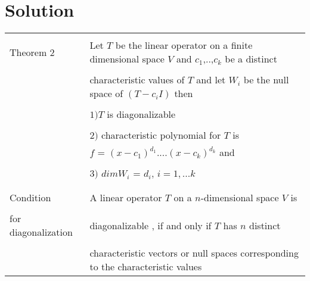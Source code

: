 \documentclass[journal,12pt]{IEEEtran}
\begin{document}
\section{\textbf{Solution}}
\begin{longtable}{|l|l|}
\hline
\multirow{3}{*}{Theorem 2} & \\
& Let $T$ be the linear operator on a finite dimensional space $V$ and $c_1$,..,$c_k$ be a distinct \\
&\\
&characteristic values of $T$ and let $W_i$ be the null space of $(T-c_iI)$ then \\
&\\
& $1)T$ is diagonalizable \\
&\\
& $2)$ characteristic polynomial for $T$ is \\
& $f$ = $(x-c_1)^{d_1}$....$(x-c_k)^{d_k}$ and \\
&\\
& $3)$ $dim W_i$ = $d_i$, $i= 1,...k$\\
&\\
\hline
\multirow{3}{*}{Condition} & \\
&
A linear operator $T$ on a $n$-dimensional space $V$ is\\ 
&\\ for diagonalization
& diagonalizable , if and only if $T$ has $n$ distinct \\
&\\
& characteristic vectors or null spaces corresponding to the characteristic values\\
\hline
\end{longtable}
\newpage
\end{document}
